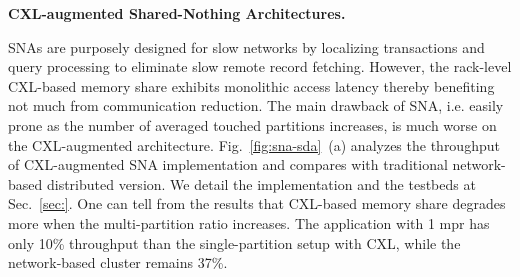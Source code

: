 

 
\noindent \textbf{CXL-augmented Shared-Nothing Architectures. }

SNAs are purposely designed for slow networks by localizing transactions and query processing to eliminate slow remote record fetching. 
However, the rack-level CXL-based memory share exhibits monolithic access latency thereby benefiting not much from communication reduction. 
The main drawback of SNA, i.e. easily prone as the number of averaged touched partitions increases, is much worse on the CXL-augmented architecture. 
Fig.~\ref{fig:sna-sda}~(a) analyzes the throughput of CXL-augmented SNA implementation and compares with traditional network-based distributed version. 
We detail the implementation and the testbeds at Sec.~\ref{sec:}. 
One can tell from the results that CXL-based memory share degrades more when the multi-partition ratio increases. The application with 1 mpr has only 10\% throughput than the single-partition setup with CXL, while the network-based cluster remains 37\%. 
